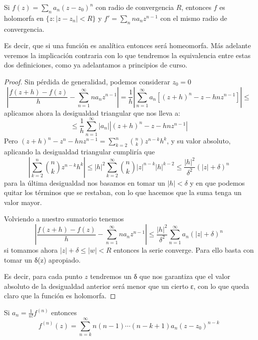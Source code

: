 \documentclass{apuntes}
\begin{document}
\begin{prop}
Si $f(z)=\sum_n a_n(z-z_0)^n$ con radio de convergencia $R$, entonces $f$ es holomorfa en $\{z: |z-z_n|<R\}$ y $f'=\sum_n n a_n z^{n-1}$ con el mismo radio de convergencia.

Es decir, que si una función es analítica entonces será homeomorfa. Más adelante veremos la implicación contraria con lo que tendremos la equivalencia entre estas dos definiciones, como ya adelantamos a principios de curso.
\end{prop}
\begin{proof}
Sin pérdida de generalidad, podemos considerar $z_0 = 0$
\[\left|\frac{f(z+h)-f(z)}{h}- \sum_{n=1}^{\infty}na_nz^{n-1}\right|=\frac{1}{h}\left|\sum_{n=1}^{\infty} a_n \left[(z+h)^n-z-hnz^{n-1}\right] \right| \leq\]
aplicamos ahora la desigualdad triangular que nos lleva a:
\[\leq \frac{1}{h} \sum_{n=1}^{\infty}|a_n|\left| (z+h)^n-z-hnz^{n-1} \right |\]
Pero $(z+h)^n -z^n-hnz^{n-1} = \sum_{k=2}^{n}{n \choose k} z^{n-k}h^k$, y su valor absoluto, aplicando la desigualdad triangular cumpliría que
\[\left|\sum_{k=2}^{n}{n \choose k} z^{n-k}h^k \right| \leq |h|^2 \sum_{k=2}^{\infty}{n \choose k}|z|^{n-k}|h|^{k-2} \leq \frac{|h|^2}{δ^2} \left( |z| + δ\right)^n\]
para la última desigualdad nos basamos en tomar un $|h|<δ$ y en que podemos quitar los términos que se restaban, con lo que hacemos que la suma tenga un valor mayor.

Volviendo a nuestro sumatorio tenemos
\[\left|\frac{f(z+h)-f(z)}{h}- \sum_{n=1}^{\infty}na_nz^{n-1}\right| \leq  \frac{|h|^2}{δ^2} \sum_{n=1}^{\infty} a_n\left( |z| + δ\right)^n\]
si tomamos ahora $|z|+δ \leq |w| < R$ entonces la serie converge. Para ello basta con tomar un δ(z) apropiado.

Es decir, para cada punto $z$ tendremos un δ que nos garantiza que el valor absoluto de la desigualdad anterior será menor que un cierto ε, con lo que queda claro que la función es holomorfa.

\end{proof}

\obs Si $a_n = \frac{1}{n!}f^{(n)}$ entonces
\[f^{(n)}(z)=\sum_{n=k}^{\infty}n(n-1)\cdots (n-k+1)a_n(z-z_0)^{n-k}\]
\end{document}
